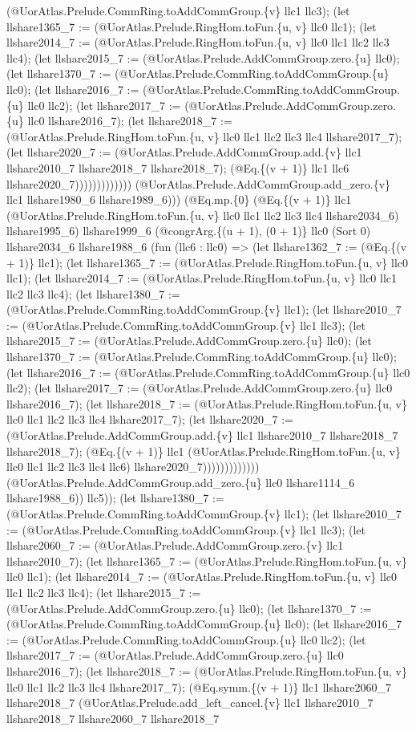 \documentclass[11pt]{article}
\begin{document}
(@UorAtlas.Prelude.CommRing.toAddCommGroup.\{v\} llc1 llc3); (let llshare1365\_7 := (@UorAtlas.Prelude.RingHom.toFun.\{u, v\} llc0 llc1); (let llshare2014\_7 := (@UorAtlas.Prelude.RingHom.toFun.\{u, v\} llc0 llc1 llc2 llc3 llc4); (let llshare2015\_7 := (@UorAtlas.Prelude.AddCommGroup.zero.\{u\} llc0); (let llshare1370\_7 := (@UorAtlas.Prelude.CommRing.toAddCommGroup.\{u\} llc0); (let llshare2016\_7 := (@UorAtlas.Prelude.CommRing.toAddCommGroup.\{u\} llc0 llc2); (let llshare2017\_7 := (@UorAtlas.Prelude.AddCommGroup.zero.\{u\} llc0 llshare2016\_7); (let llshare2018\_7 := (@UorAtlas.Prelude.RingHom.toFun.\{u, v\} llc0 llc1 llc2 llc3 llc4 llshare2017\_7); (let llshare2020\_7 := (@UorAtlas.Prelude.AddCommGroup.add.\{v\} llc1 llshare2010\_7 llshare2018\_7 llshare2018\_7); (@Eq.\{(v + 1)\} llc1 llc6 llshare2020\_7))))))))))))) (@UorAtlas.Prelude.AddCommGroup.add\_zero.\{v\} llc1 llshare1980\_6 llshare1989\_6))) (@Eq.mp.\{0\} (@Eq.\{(v + 1)\} llc1 (@UorAtlas.Prelude.RingHom.toFun.\{u, v\} llc0 llc1 llc2 llc3 llc4 llshare2034\_6) llshare1995\_6) llshare1999\_6 (@congrArg.\{(u + 1), (0 + 1)\} llc0 (Sort 0) llshare2034\_6 llshare1988\_6 (fun (llc6 : llc0) => (let llshare1362\_7 := (@Eq.\{(v + 1)\} llc1); (let llshare1365\_7 := (@UorAtlas.Prelude.RingHom.toFun.\{u, v\} llc0 llc1); (let llshare2014\_7 := (@UorAtlas.Prelude.RingHom.toFun.\{u, v\} llc0 llc1 llc2 llc3 llc4); (let llshare1380\_7 := (@UorAtlas.Prelude.CommRing.toAddCommGroup.\{v\} llc1); (let llshare2010\_7 := (@UorAtlas.Prelude.CommRing.toAddCommGroup.\{v\} llc1 llc3); (let llshare2015\_7 := (@UorAtlas.Prelude.AddCommGroup.zero.\{u\} llc0); (let llshare1370\_7 := (@UorAtlas.Prelude.CommRing.toAddCommGroup.\{u\} llc0); (let llshare2016\_7 := (@UorAtlas.Prelude.CommRing.toAddCommGroup.\{u\} llc0 llc2); (let llshare2017\_7 := (@UorAtlas.Prelude.AddCommGroup.zero.\{u\} llc0 llshare2016\_7); (let llshare2018\_7 := (@UorAtlas.Prelude.RingHom.toFun.\{u, v\} llc0 llc1 llc2 llc3 llc4 llshare2017\_7); (let llshare2020\_7 := (@UorAtlas.Prelude.AddCommGroup.add.\{v\} llc1 llshare2010\_7 llshare2018\_7 llshare2018\_7); (@Eq.\{(v + 1)\} llc1 (@UorAtlas.Prelude.RingHom.toFun.\{u, v\} llc0 llc1 llc2 llc3 llc4 llc6) llshare2020\_7))))))))))))) (@UorAtlas.Prelude.AddCommGroup.add\_zero.\{u\} llc0 llshare1114\_6 llshare1988\_6)) llc5)); (let llshare1380\_7 := (@UorAtlas.Prelude.CommRing.toAddCommGroup.\{v\} llc1); (let llshare2010\_7 := (@UorAtlas.Prelude.CommRing.toAddCommGroup.\{v\} llc1 llc3); (let llshare2060\_7 := (@UorAtlas.Prelude.AddCommGroup.zero.\{v\} llc1 llshare2010\_7); (let llshare1365\_7 := (@UorAtlas.Prelude.RingHom.toFun.\{u, v\} llc0 llc1); (let llshare2014\_7 := (@UorAtlas.Prelude.RingHom.toFun.\{u, v\} llc0 llc1 llc2 llc3 llc4); (let llshare2015\_7 := (@UorAtlas.Prelude.AddCommGroup.zero.\{u\} llc0); (let llshare1370\_7 := (@UorAtlas.Prelude.CommRing.toAddCommGroup.\{u\} llc0); (let llshare2016\_7 := (@UorAtlas.Prelude.CommRing.toAddCommGroup.\{u\} llc0 llc2); (let llshare2017\_7 := (@UorAtlas.Prelude.AddCommGroup.zero.\{u\} llc0 llshare2016\_7); (let llshare2018\_7 := (@UorAtlas.Prelude.RingHom.toFun.\{u, v\} llc0 llc1 llc2 llc3 llc4 llshare2017\_7); (@Eq.symm.\{(v + 1)\} llc1 llshare2060\_7 llshare2018\_7 (@UorAtlas.Prelude.add\_left\_cancel.\{v\} llc1 llshare2010\_7 llshare2018\_7 llshare2060\_7 llshare2018\_7 
\end{document}
